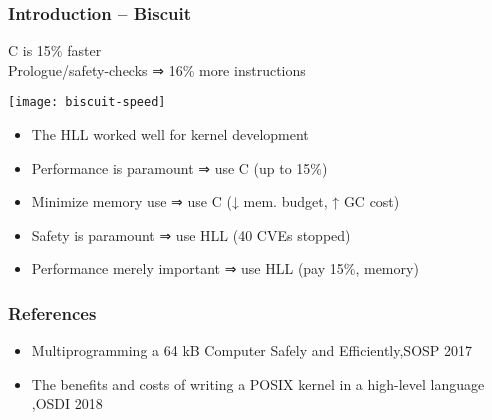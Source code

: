 \begin{frame}[plain]
	\frametitle{Introduction -- Biscuit}
	\centering
	C is 15\% faster \\
	Prologue/safety-checks ⇒ 16\% more instructions
		
	\texttt{[image: biscuit-speed]}
	
	\begin{itemize}
	
	\item The HLL worked well for kernel development
	
	\item Performance is paramount ⇒ use C (up to 15\%)
	
	\item Minimize memory use ⇒ use C (↓ mem. budget, ↑ GC cost)
	
	\item Safety is paramount ⇒ use HLL (40 CVEs stopped)
	
	\item Performance merely important ⇒ use HLL (pay 15\%, memory)
	
\end{itemize}
	
\end{frame}
\begin{frame}[plain]
	\frametitle{References}

	\begin{itemize}

		\item Multiprogramming a 64 kB Computer Safely and Efficiently,SOSP 2017
		\item  The benefits and costs of writing a POSIX
		kernel in a high-level language
		,OSDI 2018
		
	\end{itemize}
	
	
\end{frame}
